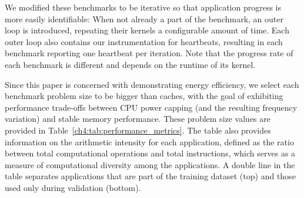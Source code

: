 We modified these benchmarks to be iterative so that application progress is more easily identifiable: When not already a part of the benchmark, an outer loop is introduced, repeating their kernels a configurable amount of time. Each outer loop also contains our instrumentation for heartbeats, resulting in each  benchmark reporting one heartbeat per iteration. Note that the progress rate of each benchmark is different and depends on the runtime of its kernel.

Since this paper is concerned with demonstrating energy efficiency, we select each benchmark problem size to be bigger than caches, with the goal of exhibiting performance trade-offs between CPU power capping (and the resulting frequency variation) and stable memory performance.
These problem size values are provided in Table~\ref{ch4:tab:performance_metrics}. The table also provides information on the arithmetic intensity for each application, defined as the ratio between total computational operations  and total instructions, which serves as a measure of computational diversity among the applications. A double line  in the table separates applications that are part of the training dataset (top) and those used only during validation (bottom).

